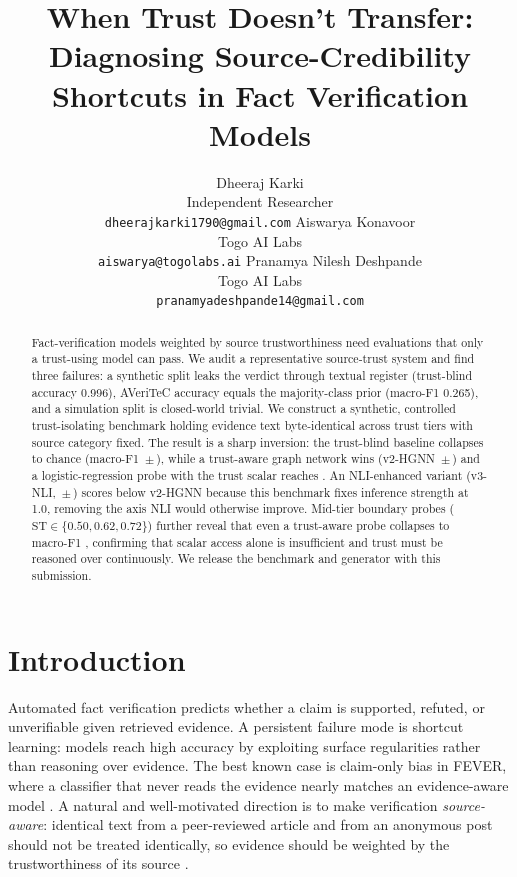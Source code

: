 \documentclass[11pt]{article}
\title{When Trust Doesn't Transfer: Diagnosing Source-Credibility Shortcuts in Fact Verification Models}
\author{Dheeraj Karki \\
  Independent Researcher \\
  \texttt{dheerajkarki1790@gmail.com} \And
  Aiswarya Konavoor \\
  Togo AI Labs \\
  \texttt{aiswarya@togolabs.ai} \And
  Pranamya Nilesh Deshpande \\
  Togo AI Labs \\
  \texttt{pranamyadeshpande14@gmail.com}}
\begin{document}
\maketitle

\begin{abstract}
Fact-verification models weighted by source trustworthiness need evaluations that only a trust-using model can pass. We audit a representative source-trust system and find three failures: a synthetic split leaks the verdict through textual register (trust-blind accuracy 0.996), AVeriTeC accuracy equals the majority-class prior (macro-F1 0.265), and a simulation split is closed-world trivial. We construct a synthetic, controlled trust-isolating benchmark holding evidence text byte-identical across trust tiers with source category fixed. The result is a sharp inversion: the trust-blind baseline collapses to chance (macro-F1 \BaselineMF\,$\pm$\,\BaselineStd), while a trust-aware graph network wins (v2-HGNN \VtwoMF\,$\pm$\,\VtwoStd) and a logistic-regression probe with the trust scalar reaches \LogAwareMF. An NLI-enhanced variant (v3-NLI, \VthreeMF\,$\pm$\,\VthreeStd) scores below v2-HGNN because this benchmark fixes inference strength at 1.0, removing the axis NLI would otherwise improve. Mid-tier boundary probes ($\mathrm{ST}\in\{0.50,0.62,0.72\}$) further reveal that even a trust-aware probe collapses to macro-F1 \MidTierMF, confirming that scalar access alone is insufficient and trust must be reasoned over continuously. We release the benchmark and generator with this submission.
\end{abstract}

\section{Introduction}
Automated fact verification predicts whether a claim is supported, refuted, or unverifiable given retrieved evidence. A persistent failure mode is shortcut learning: models reach high accuracy by exploiting surface regularities rather than reasoning over evidence. The best known case is claim-only bias in FEVER, where a classifier that never reads the evidence nearly matches an evidence-aware model \citep{schuster2019debias}. A natural and well-motivated direction is to make verification \emph{source-aware}: identical text from a peer-reviewed article and from an anonymous post should not be treated identically, so evidence should be weighted by the trustworthiness of its source \citep{popat2018declare,baly2018factuality}.
\end{document}
